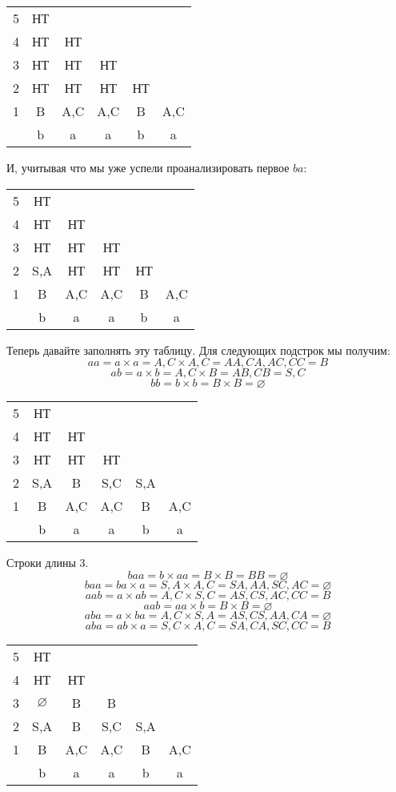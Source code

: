 \documentclass[14pt]{extarticle}
\begin{document}
\begin{center}
    \begin{tabular}{ c c c c c c}
    5 & НТ & & & & \\ 
    4 & НТ & НТ & &  \\  
    3 & НТ & НТ & НТ &  \\  
    2 & НТ & НТ & НТ & НТ  \\  
    1 & B & A,C & A,C & B & A,C  \\
      & b  &  a &  a & b  &  a 
    \end{tabular}
\end{center}
И, учитывая что мы уже успели проанализировать первое $ba$:
\begin{center}
    \begin{tabular}{ c c c c c c}
    5 & НТ & & & & \\ 
    4 & НТ & НТ & &  \\  
    3 & НТ & НТ & НТ &  \\  
    2 & S,A & НТ & НТ & НТ  \\  
    1 & B & A,C & A,C & B & A,C  \\
      & b  &  a &  a & b  &  a 
    \end{tabular}
\end{center}
Теперь давайте заполнять эту таблицу. Для следующих подстрок мы получим:
$$aa = a\times a = A,C \times A,C = AA, CA, AC, CC = B$$
$$ab = a\times b = A,C \times B = AB, CB = S, C$$
$$bb = b\times b = B \times B = \varnothing$$
\begin{center}
    \begin{tabular}{ c c c c c c}
    5 & НТ & & & & \\ 
    4 & НТ & НТ & &  \\  
    3 & НТ & НТ & НТ &  \\  
    2 & S,A & B & S,C & S,A  \\  
    1 & B & A,C & A,C & B & A,C  \\
      & b  &  a &  a & b  &  a 
    \end{tabular}
\end{center}
Строки длины 3.
$$baa = b\times aa = B \times B = BB = \varnothing$$
$$baa = ba\times a = S,A \times A,C = SA, AA, SC, AC = \varnothing$$
$$aab = a\times ab = A,C \times S,C = AS, CS, AC, CC = B$$
$$aab = aa\times b = B \times B = \varnothing$$
$$aba = a\times ba = A,C \times S,A = AS, CS, AA, CA = \varnothing$$
$$aba = ab\times a = S,C \times A,C = SA, CA, SC, CC = B$$
\begin{center}
    \begin{tabular}{ c c c c c c}
    5 & НТ & & & & \\ 
    4 & НТ & НТ & &  \\  
    3 & $\varnothing$ & B & B &  \\  
    2 & S,A & B & S,C & S,A  \\  
    1 & B & A,C & A,C & B & A,C  \\
      & b  &  a &  a & b  &  a 
    \end{tabular}
\end{center}
\end{document}
